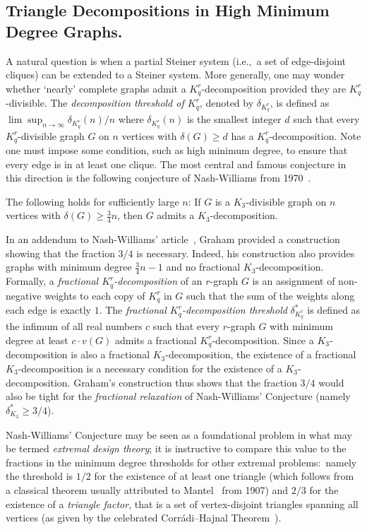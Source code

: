 \documentclass[twoside,leqno]{article}
\begin{document}
\subsection{Triangle Decompositions in High Minimum Degree Graphs.} A natural question is when a partial Steiner system (i.e.,~a set of edge-disjoint cliques) can be extended to a Steiner system. More generally, one may wonder whether `nearly' complete graphs admit a $K_q^r$-decomposition provided they are $K_q^r$-divisible. The \emph{decomposition threshold of $K_q^r$}, denoted by $\delta_{K_q^r}$, is defined as $\lim\sup_{n\rightarrow \infty} \delta_{K_q^r}(n)/n$ where $\delta_{K_q^r}(n)$ is the smallest integer $d$ such that every $K_q^r$-divisible graph $G$ on $n$ vertices with $\delta(G)\ge d$ has a $K_q^r$-decomposition. Note one must impose some condition, such as high minimum degree, to ensure that every edge is in at least one clique. The most central and famous conjecture in this direction is the following conjecture of Nash-Williams from 1970~\cite{NW70}.

\begin{conj}\label{conj:NW}
The following holds for sufficiently large $n$: If $G$ is a $K_3$-divisible graph on $n$ vertices with $\delta(G)\ge \frac{3}{4}n$,  then $G$ admits a $K_3$-decomposition.
\end{conj}

In an addendum to Nash-Williams' article~\cite{NW70}, Graham provided a construction showing that the fraction $3/4$ is necessary. Indeed, his construction also provides graphs with minimum degree $\frac{3}{4}n-1$ and no fractional $K_3$-decomposition. Formally, a \emph{fractional $K_q^r$-decomposition} of an $r$-graph $G$ is an assignment of non-negative weights to each copy of $K_q^r$ in $G$ such that the sum of the weights along each edge is exactly $1$. The \emph{fractional $K_q^r$-decomposition threshold} $\delta^*_{K_q^r}$ is defined as the infimum of all real numbers $c$ such that every $r$-graph $G$ with minimum degree at least $c\cdot v(G)$ admits a fractional $K_q^r$-decomposition. Since a $K_3$-decomposition is also a fractional $K_3$-decomposition, the existence of a fractional $K_3$-decomposition is a necessary condition for the existence of a $K_3$-decomposition. Graham's construction thus shows that the fraction $3/4$ would also be tight for the \emph{fractional relaxation} of Nash-Williams' Conjecture (namely $\delta_{K_3}^*\ge 3/4$). 

Nash-Williams' Conjecture may be seen as a foundational problem in what may be termed \emph{extremal design theory}; it is instructive to compare this value to the fractions in the minimum degree thresholds for other extremal problems:~namely the threshold is $1/2$ for the existence of at least one triangle (which follows from a classical theorem usually attributed to Mantel~\cite{mantel} from 1907) and $2/3$ for the existence of a \emph{triangle factor}, that is a set of vertex-disjoint triangles spanning all vertices (as given by the celebrated Corr\'adi--Hajnal Theorem~\cite{CH63}). 
\end{document}
